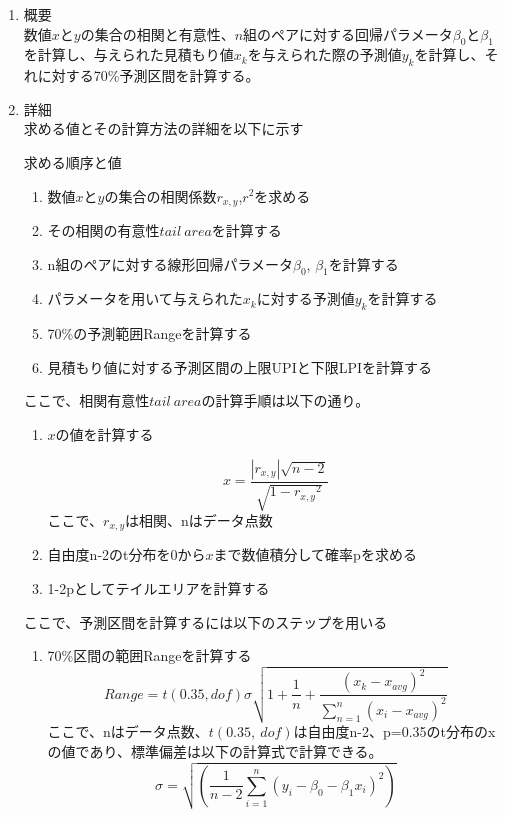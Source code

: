 \documentclass[titlepage,a4paper,12pt]{ltjsreport}
\begin{document}

\begin{enumerate}
    \item 概要 \mbox{}\\
    数値$x$と$y$の集合の相関と有意性、$n$組のペアに対する回帰パラメータ$\beta_0$と$\beta_1$を計算し、与えられた見積もり値$x_k$を与えられた際の予測値$y_k$を計算し、それに対する70\%予測区間を計算する。

    \item 詳細\mbox{}\\
    求める値とその計算方法の詳細を以下に示す

    求める順序と値
    \begin{enumerate}
        \item 数値$x$と$y$の集合の相関係数$r_{x,y}$,$r^2$を求める
        \item その相関の有意性$tail\ area$を計算する
        \item n組のペアに対する線形回帰パラメータ$\beta_0$, $\beta_1$を計算する
        \item パラメータを用いて与えられた$x_k$に対する予測値$y_k$を計算する
        \item 70\%の予測範囲Rangeを計算する
        \item 見積もり値に対する予測区間の上限UPIと下限LPIを計算する\\
    \end{enumerate}
    

    ここで、相関有意性$tail\ area$の計算手順は以下の通り。

    \begin{enumerate}
        \item $x$の値を計算する
        
        \[
        x = \frac{\left\lvert r_{x,y} \right\rvert \sqrt{n-2} }{\sqrt{1-{r_{x,y}}^2}}
        \]
        ここで、$r_{x,y}$は相関、nはデータ点数

        \item 自由度n-2のt分布を0から$x$まで数値積分して確率pを求める
        \item 1-2pとしてテイルエリアを計算する\\
    \end{enumerate}

    
    ここで、予測区間を計算するには以下のステップを用いる
    \begin{enumerate}
        \item 70\%区間の範囲Rangeを計算する
        \[
        Range = t(0.35, dof)\sigma \sqrt{1 + \frac{1}{n} + \frac{(x_k - x_{avg})^2}{\sum_{n = 1}^{n} (x_i - x_{avg})^2} } 
        \]
        ここで、nはデータ点数、$t(0.35,\ dof)$は自由度n-2、p=0.35のt分布のxの値であり、標準偏差\sigma は以下の計算式で計算できる。
        \[
        \sigma = \sqrt{(\frac{1}{n-2} \sum_{i = 1}^{n} (y_i - \beta _0 - \beta _1x_i)^2 )} 
        \]


\end{enumerate}
\end{enumerate}
\end{document}
